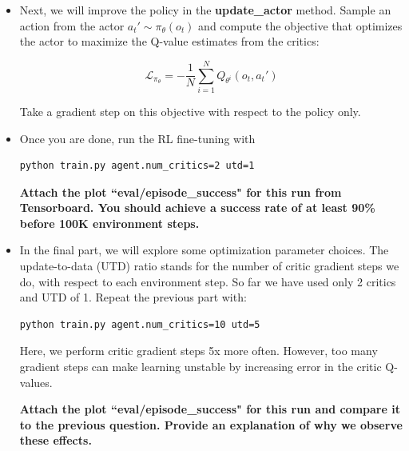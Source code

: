 \documentclass[12pt]{article}
\begin{document}
\begin{enumerate}
\begin{itemize}
\begin{enumerate}
    \end{enumerate}
    
    \item Next, we will improve the policy in the \textbf{update\_actor} method. Sample an action from the actor $a_t'\sim\pi_{\theta}(o_t)$ and compute the objective that optimizes the actor to maximize the Q-value estimates from the critics:

    $$\mathcal{L}_{\pi_{\theta}} = -\frac{1}{N}\sum_{i=1}^NQ_{\theta^i}(o_t, a_t')$$

    Take a gradient step on this objective with respect to the policy only.

\item Once you are done, run the RL fine-tuning with

\begin{tcolorbox}[width=\linewidth, sharp corners=all, colback=white!95!black]
\begin{verbatim}
python train.py agent.num_critics=2 utd=1
\end{verbatim}
\end{tcolorbox}

\textbf{\color{red}Attach the plot ``eval/episode\_success" for this run from Tensorboard. You should achieve a success rate of at least 90\% before 100K environment steps.}

\item In the final part, we will explore some optimization parameter choices. The update-to-data (UTD) ratio stands for the number of critic gradient steps we do, with respect to each environment step. So far we have used only 2 critics and UTD of 1. Repeat the previous part with:

\begin{tcolorbox}[width=\linewidth, sharp corners=all, colback=white!95!black]
\begin{verbatim}
python train.py agent.num_critics=10 utd=5
\end{verbatim}
\end{tcolorbox}
Here, we perform critic gradient steps 5x more often. However, too many gradient steps can make learning unstable by increasing error in the critic Q-values.

\textbf{\color{red}Attach the plot ``eval/episode\_success" for this run and compare it to the previous question. Provide an explanation of why we observe these effects.}

\end{itemize}

\end{enumerate}
\end{document}
